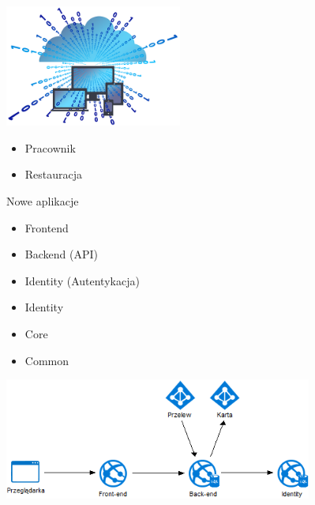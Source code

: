 \documentclass{beamer}
\begin{document}
\begin{frame}{}
	\begin{center}
		\includegraphics[height=4cm]{virtual1.png}
	\end{center}
\end{frame}

\begin{frame}{}
	\begin{huge}
		\begin{itemize}[<+->]
			\item Pracownik
			\item Restauracja
		\end{itemize}
	\end{huge}
\end{frame}

\begin{frame}{Nowe aplikacje}
	\begin{huge}
		\begin{itemize}
			\item Frontend
			\item Backend (API)
			\item Identity (Autentykacja)
		\end{itemize}
	\end{huge}
\end{frame}

\begin{frame}{}
	\begin{huge}
		\begin{itemize}[<+->]
			\item Identity
			\item Core
			\item Common
		\end{itemize}
	\end{huge}
\end{frame}

\begin{frame}{}
	\begin{center}
		\includegraphics[height=4cm]{architektura1.png}
	\end{center}
\end{frame}
\end{document}
